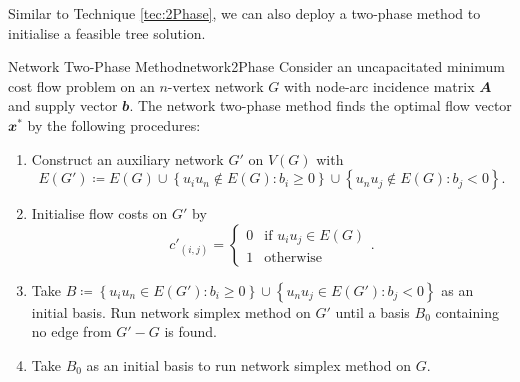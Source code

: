 \documentclass[math, code]{amznotes}
\theoremstyle{remark}
\begin{document}
Similar to Technique \ref{tec:2Phase}, we can also deploy a two-phase method to initialise a feasible tree solution.
\begin{tecbox}{Network Two-Phase Method}{network2Phase}
    Consider an uncapacitated minimum cost flow problem on an $n$-vertex network $G$ with node-arc incidence matrix $\mathbfit{A}$ and supply vector $\mathbfit{b}$. The network two-phase method finds the optimal flow vector $\mathbfit{x}^*$ by the following procedures:
    \begin{enumerate}
        \item Construct an auxiliary network $G'$ on $V(G)$ with 
        \begin{equation*}
            E(G') \coloneqq E(G) \cup \left\{u_iu_n \notin E(G) \colon b_i \geq 0 \right\} \cup \left\{u_nu_j \notin E(G) \colon b_j < 0\right\}.
        \end{equation*}
        \item Initialise flow costs on $G'$ by
        \begin{equation*}
            c'_{(i, j)} = \begin{cases}
                0 & \textrm{if } u_iu_j \in E(G) \\
                1 & \textrm{otherwise}
            \end{cases}.
        \end{equation*}
        \item Take $B \coloneqq \left\{u_iu_n \in E(G') \colon b_i \geq 0 \right\} \cup \left\{u_nu_j \in E(G') \colon b_j < 0\right\}$ as an initial basis. Run network simplex method on $G'$ until a basis $B_0$ containing no edge from $G' - G$ is found.
        \item Take $B_0$ as an initial basis to run network simplex method on $G$.
    \end{enumerate}
\end{tecbox}
\end{document}

